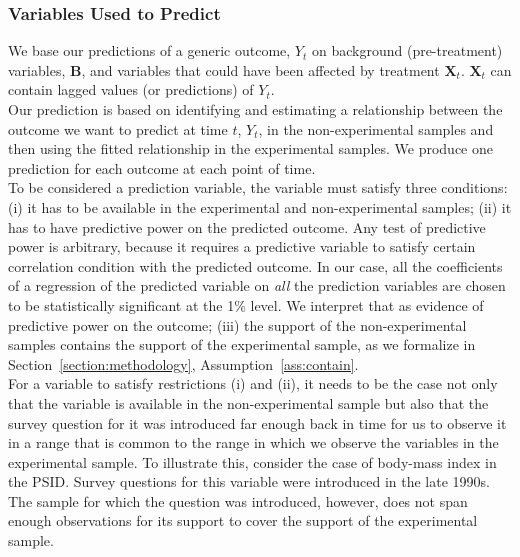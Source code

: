 \subsubsection{Variables Used to Predict}

\noindent We base our predictions of a generic outcome, $Y_{t}$ on background (pre-treatment) variables, $\bm{B}$, and variables that could have been affected by treatment $\bm{X}_{t}$. $\bm{X}_{t}$ can contain lagged values (or predictions) of $Y_{t}$.\\

\noindent Our prediction is based on identifying and estimating a relationship between the outcome we want to predict at time $t$, $Y_{t}$, in the non-experimental samples and then using the fitted relationship in the experimental samples. We produce one prediction for each outcome at each point of time. \\

\noindent To be considered a prediction variable, the variable must satisfy three conditions: (i) it has to be available in the experimental and non-experimental samples; (ii) it has to have predictive power on the predicted outcome. Any test of predictive power is arbitrary, because it requires a predictive variable to satisfy certain correlation condition with the predicted outcome. In our case, all the coefficients of a regression of the predicted variable on \textit{all} the prediction variables are chosen to be statistically significant at the 1\% level. We interpret that as evidence of predictive power on the outcome; (iii) the support of the non-experimental samples contains the support of the experimental sample, as we formalize in  Section~\ref{section:methodology},  Assumption~\ref{ass:contain}.\\

\noindent For a variable to satisfy restrictions (i) and (ii), it needs to be the case not only that the variable is available in the non-experimental sample but also that the survey question for it was introduced far enough back in time for us to observe it in a range that is common to the range in which we observe the variables in the experimental sample. To illustrate this, consider the case of body-mass index in the PSID. Survey questions for this variable were introduced in the late 1990s. The sample for which the question was introduced, however, does not span enough observations for its support to cover the support of the experimental sample.\\

